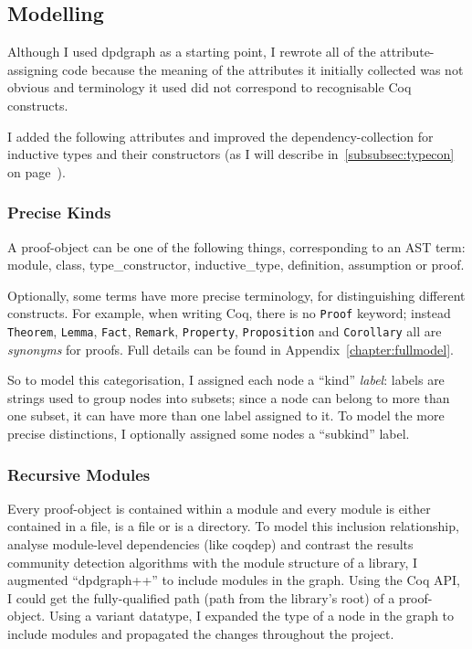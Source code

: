 \subsection{Modelling}\label{subsec:modelling}

Although I used dpdgraph as a starting point, I rewrote all of the
attribute-assigning code because the meaning of the attributes it initially
collected was not obvious and terminology it used did not correspond to
recognisable Coq constructs.

I added the following attributes and improved the dependency-collection for
inductive types and their constructors (as I will describe
in~\ref{subsubsec:typecon}~ on
page~\pageref{subsubsec:typecon}).

\subsubsection{Precise Kinds}\label{subsubsec:kinds}

A proof-object can be one of the following things, corresponding to an AST term:
\textsf{module}, \textsf{class}, \textsf{type\_constructor},
\textsf{inductive\_type}, \textsf{definition}, \textsf{assumption} or
\textsf{proof}.

Optionally, some terms have more precise terminology, for distinguishing
different constructs. For example, when writing Coq, there is no \texttt{Proof}
keyword; instead \texttt{Theorem}, \texttt{Lemma}, \texttt{Fact},
\texttt{Remark}, \texttt{Property}, \texttt{Proposition} and \texttt{Corollary}
all are \emph{synonyms} for proofs. Full details can be found in
Appendix~\ref{chapter:fullmodel}.

So to model this categorisation, I assigned each node a ``kind'' \emph{label}:
labels are strings used to group nodes into subsets; since a node can belong to
more than one subset, it can have more than one label assigned to it. To model
the more precise distinctions, I optionally assigned some nodes a ``subkind''
label.

\subsubsection{Recursive Modules}\label{subsubsec:recmodules}

Every proof-object is contained within a module and every module is either
contained in a file, is a file or is a directory. To model this inclusion
relationship, analyse module-level dependencies (like coqdep) and contrast the
results community detection algorithms with the module structure of a library, I
augmented ``dpdgraph++'' to include modules in the graph. Using the Coq API, I
could get the fully-qualified path (path from the library's root) of a
proof-object. Using a variant datatype, I expanded the type of a node in the
graph to include modules and propagated the changes throughout the project.

